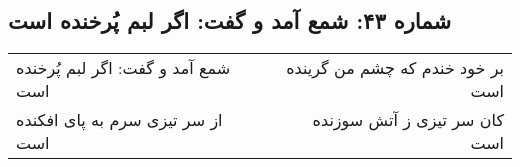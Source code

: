 \begin{center}
\section*{شماره ۴۳: شمع آمد و گفت: اگر لبم پُرخنده است}
\label{sec:043}
\begin{longtable}{l p{0.5cm} r}
شمع آمد و گفت: اگر لبم پُرخنده است
&&
بر خود خندم که چشم من گرینده است
\\
از سر تیزی سرم به پای افکنده است
&&
کان سر تیزی ز آتش سوزنده است
\\
\end{longtable}
\end{center}
